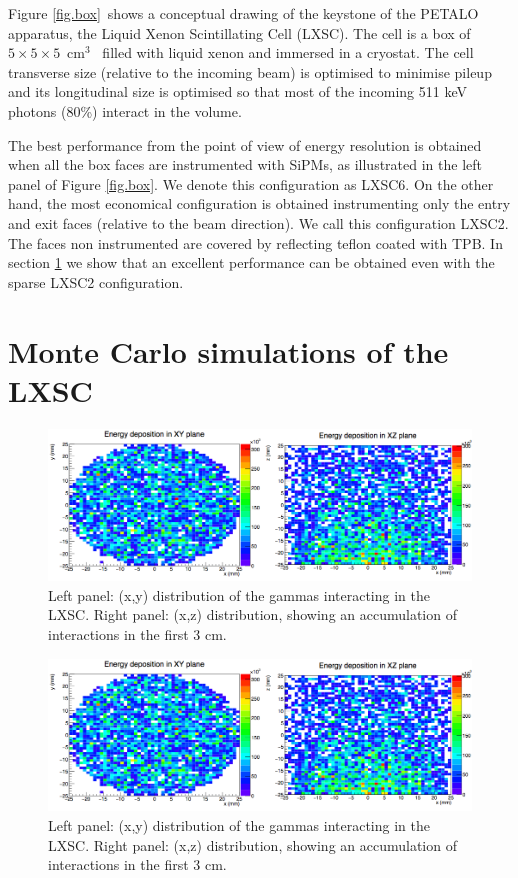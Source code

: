 \documentclass[a4paper,11pt,oneside]{article}
\begin{document}
Figure \ref{fig.box}~shows a conceptual drawing of the keystone of the PETALO apparatus, the Liquid Xenon Scintillating Cell (LXSC). The cell is a box of $5\times 5 \times 5$~cm$^3$~ filled with liquid xenon and immersed in a cryostat. The cell transverse size (relative to the incoming beam) is optimised to minimise pileup and its longitudinal size is optimised so that most of the incoming 511 keV photons (80\%) interact in the volume. 

The best performance from the point of view of energy resolution is obtained when all the box faces are instrumented with SiPMs, as illustrated in the left panel of Figure \ref{fig.box}. We denote this configuration as LXSC6. On the other hand, the most economical configuration is obtained instrumenting only the entry and exit faces (relative to the beam direction). We call this configuration LXSC2. 
The faces non instrumented are covered by reflecting teflon coated with TPB. In section \ref{sec.mc} we show that an excellent performance can be obtained even with the sparse LXSC2 configuration. 

\section{Monte Carlo simulations of the LXSC}
\label{sec.mc}

\begin{figure}[!htb]
	\centering
	\includegraphics[scale=0.5]{img/gammas.png}
	\caption{\label{fig.gammas}  Left panel: (x,y) distribution of the gammas interacting in the LXSC. Right panel: (x,z) distribution, showing an accumulation of interactions in the first 3 cm.  }
\end{figure}

\begin{figure}[!htb]
	\centering
	\includegraphics[scale=0.5]{img/gammas.png}
	\caption{\label{fig.gammas}  Left panel: (x,y) distribution of the gammas interacting in the LXSC. Right panel: (x,z) distribution, showing an accumulation of interactions in the first 3 cm.  }
\end{figure}
\end{document}
